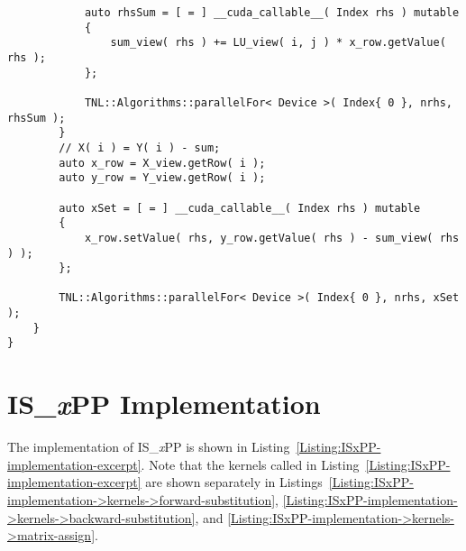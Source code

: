 \begin{lstlisting}
			auto rhsSum = [ = ] __cuda_callable__( Index rhs ) mutable
			{
				sum_view( rhs ) += LU_view( i, j ) * x_row.getValue( rhs );
			};
			
			TNL::Algorithms::parallelFor< Device >( Index{ 0 }, nrhs, rhsSum );
		}
		// X( i ) = Y( i ) - sum;		
		auto x_row = X_view.getRow( i );
		auto y_row = Y_view.getRow( i );
		
		auto xSet = [ = ] __cuda_callable__( Index rhs ) mutable
		{
			x_row.setValue( rhs, y_row.getValue( rhs ) - sum_view( rhs ) );
		};
		
		TNL::Algorithms::parallelFor< Device >( Index{ 0 }, nrhs, xSet );
	}
}
\end{lstlisting}




\chapter{IS\_\textit{x}PP Implementation}\label{Appendix:ISxPP-implementation}
The implementation of IS\_\textit{x}PP is shown in Listing~\ref{Listing:ISxPP-implementation-excerpt}.
Note that the kernels called in Listing~\ref{Listing:ISxPP-implementation-excerpt} are shown separately in Listings~\ref{Listing:ISxPP-implementation->kernels->forward-substitution}, \ref{Listing:ISxPP-implementation->kernels->backward-substitution}, and \ref{Listing:ISxPP-implementation->kernels->matrix-assign}.


